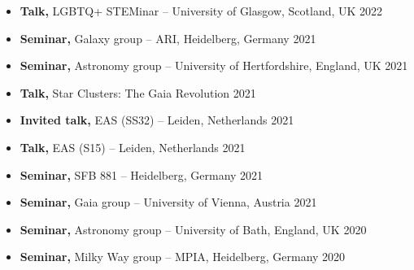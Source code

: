 \begin{itemize}
    \item \textbf{Talk,} LGBTQ+ STEMinar  -- University of Glasgow, Scotland, UK \hfill 2022
    \item \textbf{Seminar,} Galaxy group -- ARI, Heidelberg, Germany \hfill 2021
    \item \textbf{Seminar,} Astronomy group -- University of Hertfordshire, England, UK \hfill 2021
    \item \textbf{Talk,} Star Clusters: The Gaia Revolution \hfill 2021
    \item \textbf{Invited talk,} EAS (SS32) -- Leiden, Netherlands \hfill 2021
    \item \textbf{Talk,} EAS (S15) -- Leiden, Netherlands \hfill 2021
    \item \textbf{Seminar,} SFB 881 -- Heidelberg, Germany \hfill 2021
    \item \textbf{Seminar,} Gaia group -- University of Vienna, Austria \hfill 2021
    \item \textbf{Seminar,} Astronomy group -- University of Bath, England, UK \hfill 2020
    \item \textbf{Seminar,} Milky Way group -- MPIA, Heidelberg, Germany \hfill 2020
\end{itemize}
